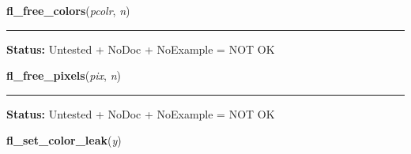     \vspace{0.5ex}

\hspace{.8\funcindent}\begin{boxedminipage}{\funcwidth}

    \raggedright \textbf{fl\_free\_colors}(\textit{pcolr}, \textit{n})

    \vspace{-1.5ex}

    \rule{\textwidth}{0.5\fboxrule}
\setlength{\parskip}{2ex}
\setlength{\parskip}{1ex}
\textbf{Status:} Untested + NoDoc + NoExample = NOT OK



    \end{boxedminipage}

    \label{xformslib:library:fl_free_pixels}

    \vspace{0.5ex}

\hspace{.8\funcindent}\begin{boxedminipage}{\funcwidth}

    \raggedright \textbf{fl\_free\_pixels}(\textit{pix}, \textit{n})

    \vspace{-1.5ex}

    \rule{\textwidth}{0.5\fboxrule}
\setlength{\parskip}{2ex}
\setlength{\parskip}{1ex}
\textbf{Status:} Untested + NoDoc + NoExample = NOT OK



    \end{boxedminipage}

    \label{xformslib:library:fl_set_color_leak}

    \vspace{0.5ex}

\hspace{.8\funcindent}\begin{boxedminipage}{\funcwidth}

    \raggedright \textbf{fl\_set\_color\_leak}(\textit{y})

\setlength{\parskip}{2ex}
\setlength{\parskip}{1ex}
    \end{boxedminipage}

